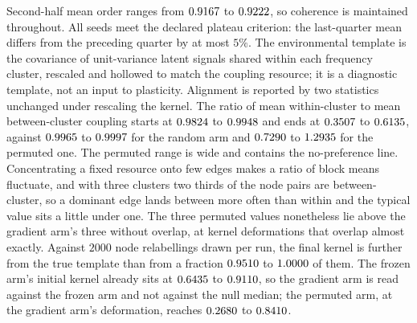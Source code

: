 \documentclass{article}
\begin{document}
Second-half mean order ranges from
$0.9167$ to $0.9222$, so coherence is maintained
throughout. All seeds meet the declared plateau criterion: the last-quarter mean
differs from the preceding quarter by at most $5\%$.
The environmental template is the covariance of unit-variance latent signals
shared within each frequency cluster, rescaled and hollowed to match the
coupling resource; it is a diagnostic template, not an input to plasticity.
Alignment is reported by two statistics unchanged under rescaling the kernel.
The ratio of mean within-cluster to mean between-cluster coupling starts at
$0.9824$ to $0.9948$ and ends at
$0.3507$ to $0.6135$, against
$0.9965$ to $0.9997$ for the random arm
and $0.7290$ to $1.2935$ for the
permuted one. The permuted range is wide and contains the no-preference
line. Concentrating a fixed resource onto few edges makes a ratio of block means
fluctuate, and with three clusters two thirds of the node pairs are
between-cluster, so a dominant edge lands between more often than within and the
typical value sits a little under one. The three permuted values nonetheless lie
above the gradient arm's three without overlap, at kernel deformations that
overlap almost exactly.
Against $2000$ node relabellings drawn per run, the final kernel is further from
the true template than from a fraction $0.9510$ to
$1.0000$ of them. The frozen arm's initial kernel already sits
at $0.6435$ to $0.9110$, so the
gradient arm is read against the frozen arm and not against the null median; the
permuted arm, at the gradient arm's deformation, reaches
$0.2680$ to $0.8410$.
\end{document}

